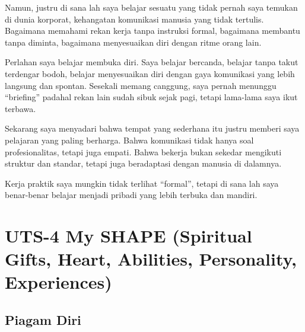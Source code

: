 \documentclass[
  letterpaper,
  DIV=11,
  numbers=noendperiod]{scrreprt}
\begin{document}
Namun, justru di sana lah saya belajar sesuatu yang tidak pernah saya
temukan di dunia korporat, kehangatan komunikasi manusia yang tidak
tertulis. Bagaimana memahami rekan kerja tanpa instruksi formal,
bagaimana membantu tanpa diminta, bagaimana menyesuaikan diri dengan
ritme orang lain.

Perlahan saya belajar membuka diri. Saya belajar bercanda, belajar tanpa
takut terdengar bodoh, belajar menyesuaikan diri dengan gaya komunikasi
yang lebih langsung dan spontan. Sesekali memang canggung, saya pernah
menunggu ``briefing'' padahal rekan lain sudah sibuk sejak pagi, tetapi
lama-lama saya ikut terbawa.

Sekarang saya menyadari bahwa tempat yang sederhana itu justru memberi
saya pelajaran yang paling berharga. Bahwa komunikasi tidak hanya soal
profesionalitas, tetapi juga empati. Bahwa bekerja bukan sekedar
mengikuti struktur dan standar, tetapi juga beradaptasi dengan manusia
di dalamnya.

Kerja praktik saya mungkin tidak terlihat ``formal'', tetapi di sana lah
saya benar-benar belajar menjadi pribadi yang lebih terbuka dan mandiri.


\chapter{UTS-4 My SHAPE (Spiritual Gifts, Heart, Abilities, Personality,
Experiences)}\label{uts-4-my-shape-spiritual-gifts-heart-abilities-personality-experiences}

\section{Piagam Diri}\label{piagam-diri}
\end{document}
